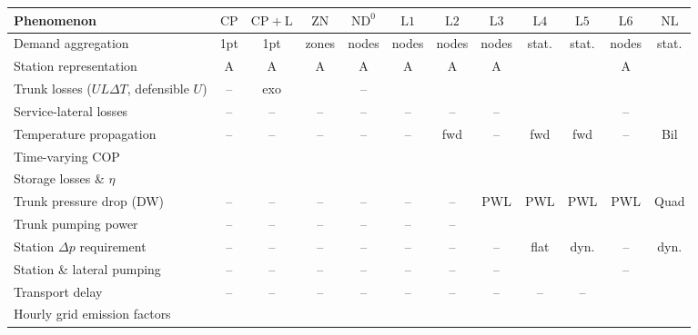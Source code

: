 \documentclass[a4paper,fleqn]{cas-sc} %
\newcommand{\CP}{\ensuremath{\mathrm{CP}}}      %
\newcommand{\CPL}{\ensuremath{\mathrm{CP{+}L}}} %
\newcommand{\ZN}{\ensuremath{\mathrm{ZN}}}      %
\newcommand{\NDz}{\ensuremath{\mathrm{ND^{0}}}} %
\newcommand{\Lone}{\ensuremath{\mathrm{L1}}}    %
\newcommand{\Ltwo}{\ensuremath{\mathrm{L2}}}    %
\newcommand{\Lthree}{\ensuremath{\mathrm{L3}}}  %
\newcommand{\Lfour}{\ensuremath{\mathrm{L4}}}   %
\newcommand{\Lfive}{\ensuremath{\mathrm{L5}}}   %
\newcommand{\Lsix}{\ensuremath{\mathrm{L6}}}    %
\newcommand{\NLref}{\ensuremath{\mathrm{NL}}}   %
\renewcommand{\checkmark}{\ding{51}} %
\providecommand{\DIFaddend}{} %
\providecommand{\DIFdelbegin}{} %
\begin{document}
{\begin{table}[htbp]
\setlength{\tabcolsep}{3pt}
\begin{tabular}{@{}lcc|c|cccccccc@{}}
\hline
Phenomenon & $\CP$ & $\CPL$ & $\ZN$ & $\NDz$ & $\Lone$ & $\Ltwo$ & $\Lthree$ & $\Lfour$ & $\Lfive$ & $\Lsix$ & $\NLref$ \\
\hline
Demand aggregation & 1pt & 1pt & zones & nodes & nodes & nodes & nodes & stat. & stat. & nodes & stat. \\
Station representation & A & A & A & A & A & A & A & \checkmark & \checkmark & A & \checkmark \\
Trunk losses ($U\!L\Delta T$, defensible $U$) & -- & exo & \checkmark & -- & \checkmark & \checkmark & \checkmark & \checkmark & \checkmark & \checkmark & \checkmark \\
Service-lateral losses & -- & -- & -- & -- & -- & -- & -- & \checkmark & \checkmark & -- & \checkmark \\
Temperature propagation & -- & -- & -- & -- & -- & fwd & -- & fwd & fwd & -- & Bil \\
Time-varying COP & \checkmark & \checkmark & \checkmark & \checkmark & \checkmark & \checkmark & \checkmark & \checkmark & \checkmark & \checkmark & \checkmark \\
Storage losses \& $\eta$ & \checkmark & \checkmark & \checkmark & \checkmark & \checkmark & \checkmark & \checkmark & \checkmark & \checkmark & \checkmark & \checkmark \\
Trunk pressure drop (DW) & -- & -- & -- & -- & -- & -- & PWL & PWL & PWL & PWL & Quad \\
Trunk pumping power & -- & -- & -- & -- & -- & -- & \checkmark & \checkmark & \checkmark & \checkmark & \checkmark \\
Station $\Delta p$ requirement & -- & -- & -- & -- & -- & -- & -- & flat & dyn. & -- & dyn. \\
Station \& lateral pumping & -- & -- & -- & -- & -- & -- & -- & \checkmark & \checkmark & -- & \checkmark \\
Transport delay & -- & -- & -- & -- & -- & -- & -- & -- & -- & \checkmark & \checkmark \\
Hourly grid emission factors & \checkmark & \checkmark & \checkmark & \checkmark & \checkmark & \checkmark & \checkmark & \checkmark & \checkmark & \checkmark & \checkmark \\
\hline
\end{tabular}
\end{table}
\DIFaddend 


\DIFdelbegin %

}
\end{document}
